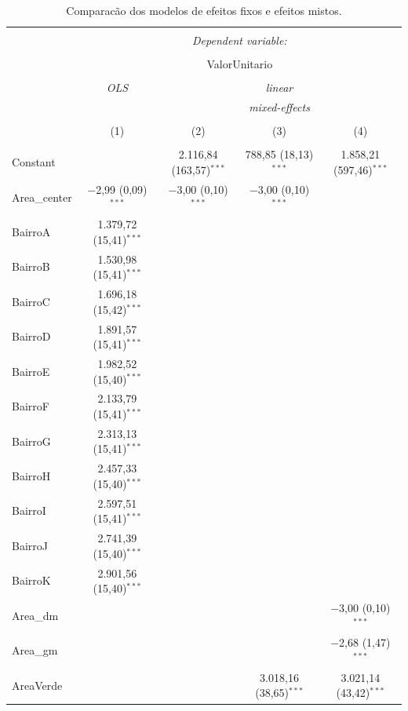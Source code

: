\documentclass[
  a4paper, 11pt]{article}
\begin{document}
\begin{table}[H] \centering 
  \caption{Comparacão dos modelos de  efeitos fixos e efeitos mistos.} 
  \label{tab:fits} 
\scriptsize 
\begin{tabular}{@{\extracolsep{5pt}}lcccc} 
\\[-1.8ex]\hline 
\hline \\[-1.8ex] 
 & \multicolumn{4}{c}{\textit{Dependent variable:}} \\ 
\cline{2-5} 
\\[-1.8ex] & \multicolumn{4}{c}{ValorUnitario} \\ 
\\[-1.8ex] & \textit{OLS} & \multicolumn{3}{c}{\textit{linear}} \\ 
 & \textit{} & \multicolumn{3}{c}{\textit{mixed-effects}} \\ 
\\[-1.8ex] & (1) & (2) & (3) & (4)\\ 
\hline \\[-1.8ex] 
 Constant &  & 2.116,84 (163,57)$^{***}$ & 788,85 (18,13)$^{***}$ & 1.858,21 (597,46)$^{***}$ \\ 
  Area\_center & $-$2,99 (0,09)$^{***}$ & $-$3,00 (0,10)$^{***}$ & $-$3,00 (0,10)$^{***}$ &  \\ 
  BairroA & 1.379,72 (15,41)$^{***}$ &  &  &  \\ 
  BairroB & 1.530,98 (15,41)$^{***}$ &  &  &  \\ 
  BairroC & 1.696,18 (15,42)$^{***}$ &  &  &  \\ 
  BairroD & 1.891,57 (15,41)$^{***}$ &  &  &  \\ 
  BairroE & 1.982,52 (15,40)$^{***}$ &  &  &  \\ 
  BairroF & 2.133,79 (15,41)$^{***}$ &  &  &  \\ 
  BairroG & 2.313,13 (15,41)$^{***}$ &  &  &  \\ 
  BairroH & 2.457,33 (15,40)$^{***}$ &  &  &  \\ 
  BairroI & 2.597,51 (15,41)$^{***}$ &  &  &  \\ 
  BairroJ & 2.741,39 (15,40)$^{***}$ &  &  &  \\ 
  BairroK & 2.901,56 (15,40)$^{***}$ &  &  &  \\ 
  Area\_dm &  &  &  & $-$3,00 (0,10)$^{***}$ \\ 
  Area\_gm &  &  &  & $-$2,68 (1,47)$^{***}$ \\ 
  AreaVerde &  &  & 3.018,16 (38,65)$^{***}$ & 3.021,14 (43,42)$^{***}$ \\ 

\end{tabular}
\end{table}
\end{document}
